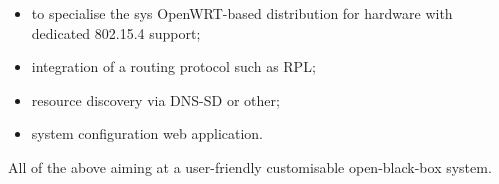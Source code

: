 \documentclass[12pt]{article}
\begin{document}
\begin{itemize}
\item to specialise the sys OpenWRT-based distribution for hardware with dedicated 802.15.4 support;
\item integration of a routing protocol such as RPL;
\item resource discovery via DNS-SD or other;
\item system configuration web application.
\end{itemize}

All of the above aiming at a user-friendly customisable open-black-box system.
\end{document}
